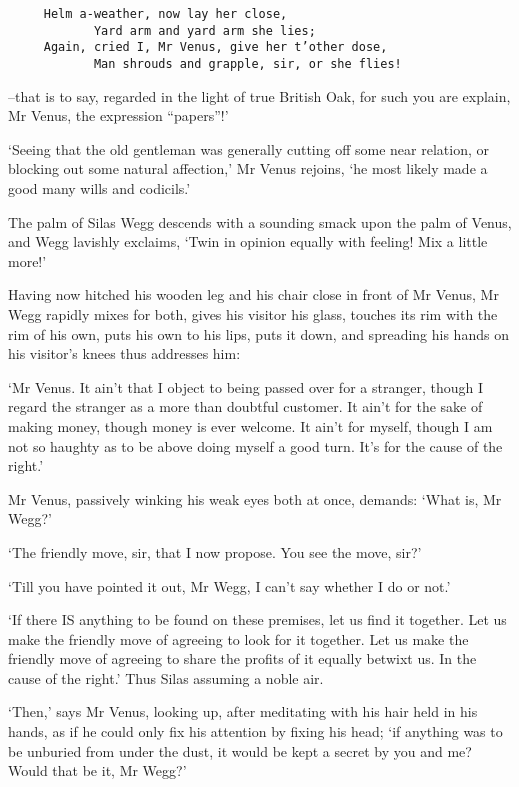 \begin{verbatim}
     Helm a-weather, now lay her close,
            Yard arm and yard arm she lies;
     Again, cried I, Mr Venus, give her t’other dose,
            Man shrouds and grapple, sir, or she flies!
\end{verbatim}

--that is to say, regarded in the light of true British Oak, for such
you are explain, Mr Venus, the expression “papers”!’

‘Seeing that the old gentleman was generally cutting off some near
relation, or blocking out some natural affection,’ Mr Venus rejoins, ‘he
most likely made a good many wills and codicils.’

The palm of Silas Wegg descends with a sounding smack upon the palm
of Venus, and Wegg lavishly exclaims, ‘Twin in opinion equally with
feeling! Mix a little more!’

Having now hitched his wooden leg and his chair close in front of Mr
Venus, Mr Wegg rapidly mixes for both, gives his visitor his glass,
touches its rim with the rim of his own, puts his own to his lips, puts
it down, and spreading his hands on his visitor’s knees thus addresses
him:

‘Mr Venus. It ain’t that I object to being passed over for a stranger,
though I regard the stranger as a more than doubtful customer. It ain’t
for the sake of making money, though money is ever welcome. It ain’t for
myself, though I am not so haughty as to be above doing myself a good
turn. It’s for the cause of the right.’

Mr Venus, passively winking his weak eyes both at once, demands: ‘What
is, Mr Wegg?’

‘The friendly move, sir, that I now propose. You see the move, sir?’

‘Till you have pointed it out, Mr Wegg, I can’t say whether I do or
not.’

‘If there IS anything to be found on these premises, let us find it
together. Let us make the friendly move of agreeing to look for it
together. Let us make the friendly move of agreeing to share the
profits of it equally betwixt us. In the cause of the right.’ Thus Silas
assuming a noble air.

‘Then,’ says Mr Venus, looking up, after meditating with his hair held
in his hands, as if he could only fix his attention by fixing his head;
‘if anything was to be unburied from under the dust, it would be kept a
secret by you and me? Would that be it, Mr Wegg?’

